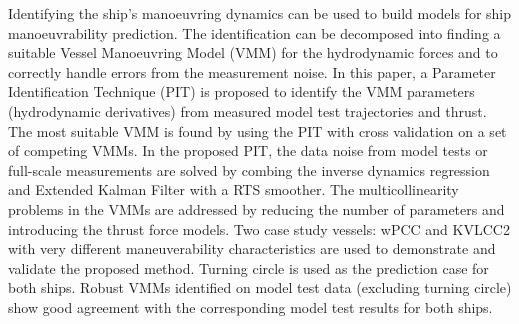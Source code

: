 Identifying the ship's manoeuvring dynamics can be used to build models for ship manoeuvrability prediction. The identification can be decomposed into finding a suitable Vessel Manoeuvring Model (VMM) for the hydrodynamic forces and to correctly handle errors from the measurement noise. 
In this paper, a Parameter Identification Technique (PIT) is proposed to identify  the VMM parameters (hydrodynamic derivatives) from measured model test trajectories and thrust. The most suitable VMM is found by using the PIT with cross validation on a set of competing VMMs.
In the proposed PIT, the data noise from model tests or full-scale measurements are solved by combing the inverse dynamics regression and Extended Kalman Filter with a RTS smoother. The multicollinearity problems in the VMMs are addressed by reducing the number of parameters and introducing the thrust force models. Two case study vessels: wPCC and KVLCC2 with very different maneuverability characteristics are used to demonstrate and validate the proposed method. 
Turning circle is used as the prediction case for both ships. Robust VMMs identified on model test data (excluding turning circle) show good agreement with the corresponding model test results for both ships.
